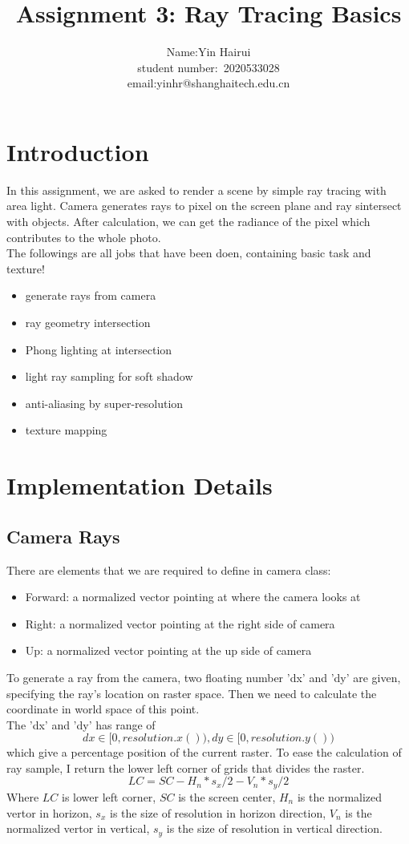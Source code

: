 \documentclass[acmtog]{acmart}
\title{Assignment 3: {Ray Tracing Basics}}
\author{Name:\quad Yin Hairui  \\ student number:\ 2020533028
\\email:\quad yinhr@shanghaitech.edu.cn}
\begin{document}
\maketitle

\vspace*{2 ex}

\section{Introduction}
In this assignment, we are asked to render a scene by simple ray tracing with area light. Camera generates rays to pixel on the screen plane and ray sintersect with objects. After calculation, we can get the radiance of the pixel which contributes to the whole photo.\\ The followings are all jobs that have been doen, containing basic task and texture!
\begin{itemize}
	\item generate rays from camera
	\item ray geometry intersection
	\item Phong lighting at intersection
	\item light ray sampling for soft shadow
	\item anti-aliasing by super-resolution
	\item texture mapping
\end{itemize}
\section{Implementation Details}
\subsection{Camera Rays}
There are elements that we are required to define in camera class:
\begin{itemize}
	\item Forward: a normalized vector pointing at where the camera looks at
	\item Right: a normalized vector pointing at the right side of camera
	\item Up: a normalized vector pointing at the up side of camera
\end{itemize}
To generate a ray from the camera, two floating number 'dx' and 'dy' are given, specifying the ray’s location on raster space. Then we need to calculate the coordinate in world space of this point.\\
The 'dx' and 'dy' has range of $$dx\in [0, resolution.x()),dy\in [0, resolution.y())$$ which give a percentage position of the current raster. To ease the calculation of ray sample, I return the lower left corner of grids that divides the raster.\\
$$LC=SC-H_n * s_x / 2 - V_n * s_y / 2$$
Where $LC$ is lower left corner, $SC$ is the screen center, $H_n$ is the normalized vertor in horizon, $s_x$ is the size of resolution in horizon direction, $V_n$ is the normalized vertor in vertical, $s_y$ is the size of resolution in vertical direction.
\end{document}
